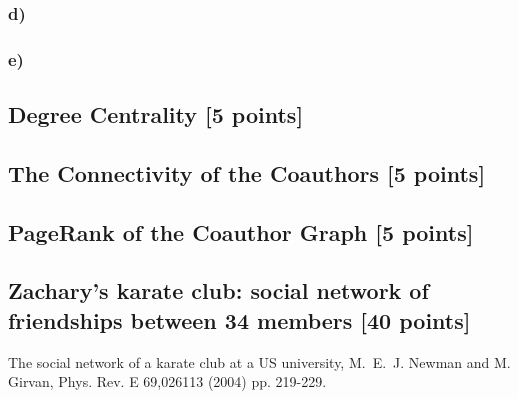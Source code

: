 \documentclass[unicode,11pt,a4paper,oneside,numbers=endperiod,openany]{scrartcl}
\begin{document}
\subsubsection*{d)}

\subsubsection*{e)}



\subsection{Degree Centrality [5 points]}

\subsection{The Connectivity of the Coauthors [5 points]}

\subsection{PageRank of the Coauthor Graph [5 points]}

\subsection{Zachary's karate club: social network of friendships between 34 members [40 points]}

\begin{thebibliography}{99}
 The social network of a karate club at a US university, M.~E.~J. Newman and M. Girvan, Phys. Rev. E 69,026113 (2004)
pp. 219-229.
\end{thebibliography}
\end{document}
